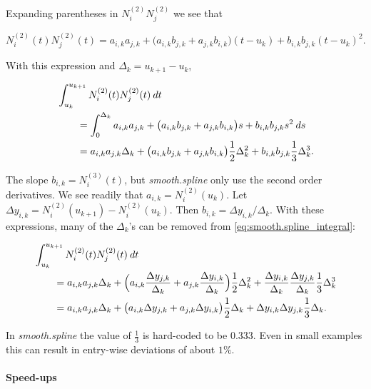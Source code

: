 \documentclass[a4paper]{scrartcl}
\newcommand\dd{\ensuremath{\:d}}
\begin{document}
Expanding parentheses in $N_i^{(2)} N_j^{(2)}$ we see that

\begin{equation*}
    N_i^{(2)}(t) N_j^{(2)}(t)
    = a_{i,k} a_{j,k} + \bigl(a_{i,k} b_{j,k} + a_{j,k} b_{i,k}\bigr) (t - u_k) + b_{i,k} b_{j,k} (t - u_k)^2.
\end{equation*}

With this expression and $\Delta_k = u_{k+1} - u_k$,

\begin{align}
    \MoveEqLeft
    \int_{u_k}^{u_{k+1}} N_i^{(2)}(t) N_j^{(2)}(t) \dd t 
    \nonumber
    \\
    & = \int_0^{\Delta_k} a_{i,k} a_{j,k} + \bigl(a_{i,k} b_{j,k} + a_{j,k} b_{i,k}\bigr) s + b_{i,k} b_{j,k} s^2 \dd s 
    \nonumber
    \\
    & = a_{i,k} a_{j,k} \Delta_k + \bigl(a_{i,k} b_{j,k} + a_{j,k} b_{i,k}\bigr) \frac12 \Delta_k^2 + b_{i,k} b_{j,k} \frac13 \Delta_k^3.
    \label{eq:smooth.spline_integral}
\end{align}

The slope $b_{i,k} = N_i^{(3)}(t)$, but \textit{smooth.spline} only use the second order derivatives.
We see readily that $a_{i,k} = N_i^{(2)}(u_k)$.
Let $\Delta y_{i,k} = N_i^{(2)}(u_{k+1}) - N_i^{(2)}(u_k)$.
Then $b_{i,k} = \Delta y_{i,k} / \Delta_k$.
With these expressions, many of the $\Delta_k$'s can be removed from \cref{eq:smooth.spline_integral}:

\begin{align*}
    \MoveEqLeft
    \int_{u_k}^{u_{k+1}} N_i^{(2)}(t) N_j^{(2)}(t) \dd t 
    \\
    & = a_{i,k} a_{j,k} \Delta_k + \Bigl(a_{i,k} \frac{\Delta y_{j,k}}{\Delta_k} + a_{j,k} \frac{\Delta y_{i,k}}{\Delta_k}\Bigr) \frac12 \Delta_k^2 + \frac{\Delta y_{i,k}}{\Delta_k} \frac{\Delta y_{j,k}}{\Delta_k} \frac13 \Delta_k^3
    \\
    & = a_{i,k} a_{j,k} \Delta_k + \bigl(a_{i,k} \Delta y_{j,k} + a_{j,k} \Delta y_{i,k}\bigr) \frac12 \Delta_k + \Delta y_{i,k} \Delta y_{j,k} \frac13 \Delta_k.
\end{align*}

In \textit{smooth.spline} the value of $\tfrac13$ is hard-coded to be $0.333$.
Even in small examples this can result in entry-wise deviations of about $1\%$.


\paragraph{Speed-ups}
\end{document}
